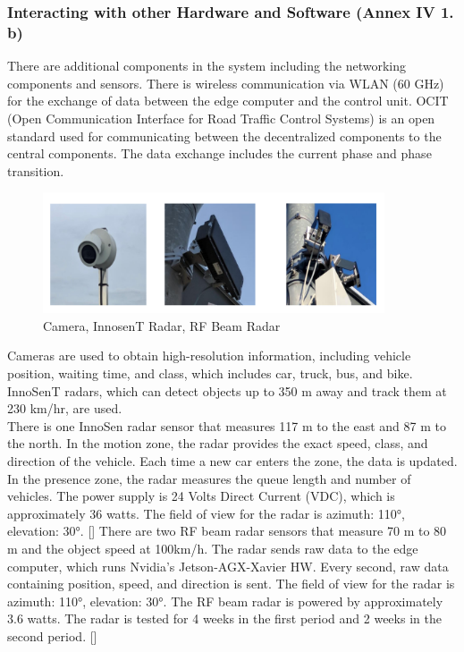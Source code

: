   \subsubsection{Interacting with other Hardware and Software (Annex IV 1. b)}
  There are additional components in the system including the networking components and sensors. There is wireless communication via WLAN (60 GHz) for the exchange of data between the edge computer and the control unit. OCIT (Open Communication Interface for Road Traffic Control Systems) is an open standard used for communicating between the decentralized components to the central components. The data exchange includes the current phase and phase transition.
  \begin{figure}[h]
        \centering
        \includegraphics[width=0.9\textwidth]{paper-template/figs/Hardware.png}
        \caption{Camera, InnosenT Radar, RF Beam Radar}
        \label{fig:my_label}
\end{figure} 
Cameras are used to obtain high-resolution information, including vehicle position, waiting time, and class, which includes car, truck, bus, and bike.
InnoSenT radars, which can detect objects up to 350 m away and track them at 230 km/hr, are used.\\
There is one InnoSen radar sensor that measures 117 m to the east and 87 m to the north. In the motion zone, the radar provides the exact speed, class, and direction of the vehicle. Each time a new car enters the zone, the data is updated. In the presence zone, the radar measures the queue length and number of vehicles. The power supply is 24 Volts Direct Current (VDC), which is approximately 36 watts. The field of view for the radar is azimuth: 110°, elevation: 30°. [\citet{KI4LSA_presentation}]
There are two RF beam radar sensors that measure 70 m to 80 m and the object speed at 100km/h. The radar sends raw data to the edge computer, which runs Nvidia's Jetson-AGX-Xavier HW. Every second, raw data containing position, speed, and direction is sent. The field of view for the radar is azimuth: 110°, elevation: 30°. The RF beam radar is powered by approximately 3.6 watts. The radar is tested for 4 weeks in the first period and 2 weeks in the second period. [\citet{KI4LSA_presentation}]
